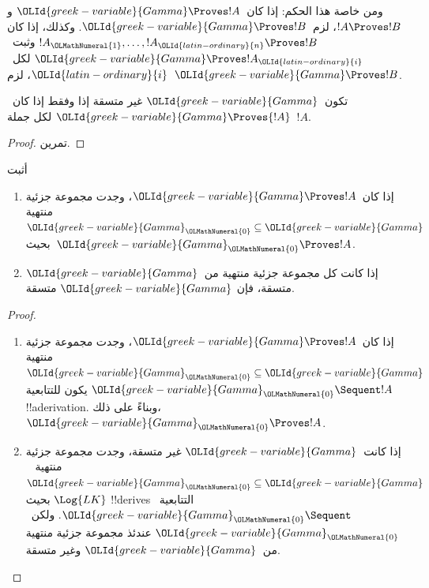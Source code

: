 \documentclass[../../../include/open-logic-section]{subfiles}
\begin{document}
ومن خاصة هذا الحكم: إذا كان~${\OLId{greek-variable}{Gamma}} \Proves !A$ و
$!A \Proves !B$، لزم~${\OLId{greek-variable}{Gamma}} \Proves !B$.
وكذلك، إذا كان $!A_{\OLMathNumeral{1}}, \dots, !A_{\OLId{latin-ordinary}{n}} \Proves !B$ وثبت~${\OLId{greek-variable}{Gamma}} \Proves !A_{\OLId{latin-ordinary}{i}}$ لكل~${\OLId{latin-ordinary}{i}}$،
لزم~${\OLId{greek-variable}{Gamma}} \Proves !B$.

\begin{prop}
تكون~${\OLId{greek-variable}{Gamma}}$ غير متسقة إذا وفقط إذا كان~${\OLId{greek-variable}{Gamma}} \Proves {!A}$ لكل
  جملة~$!A$.
\end{prop}

\begin{proof}
تمرين.
\end{proof}

\begin{prob}
أثبت 
\end{prob}

\begin{prop}[التراص]
  \begin{enumerate}
  \item إذا كان~${\OLId{greek-variable}{Gamma}} \Proves !A$، وجدت مجموعة جزئية منتهية
    ${\OLId{greek-variable}{Gamma}}_{\OLMathNumeral{0}} \subseteq {\OLId{greek-variable}{Gamma}}$ بحيث~${\OLId{greek-variable}{Gamma}}_{\OLMathNumeral{0}} \Proves !A$.
  \item إذا كانت كل مجموعة جزئية منتهية من~${\OLId{greek-variable}{Gamma}}$ متسقة، فإن
    ${\OLId{greek-variable}{Gamma}}$ متسقة.
  \end{enumerate}
\end{prop}

\begin{proof}
  \begin{enumerate}
    \item إذا كان~${\OLId{greek-variable}{Gamma}} \Proves !A$، وجدت مجموعة جزئية منتهية
      ${\OLId{greek-variable}{Gamma}}_{\OLMathNumeral{0}} \subseteq {\OLId{greek-variable}{Gamma}}$ يكون للتتابعية
      ${\OLId{greek-variable}{Gamma}}_{\OLMathNumeral{0}} \Sequent !A$ !!a{derivation}. وبناءً على ذلك،
      ${\OLId{greek-variable}{Gamma}}_{\OLMathNumeral{0}} \Proves !A$.
    \item إذا كانت~${\OLId{greek-variable}{Gamma}}$ غير متسقة، وجدت مجموعة جزئية منتهية
      ~${\OLId{greek-variable}{Gamma}}_{\OLMathNumeral{0}} \subseteq {\OLId{greek-variable}{Gamma}}$ بحيث $\Log{LK}$ !!{derive}s
      التتابعية~${\OLId{greek-variable}{Gamma}}_{\OLMathNumeral{0}} \Sequent \quad$. ولكن~${\OLId{greek-variable}{Gamma}}_{\OLMathNumeral{0}}$ عندئذ
      مجموعة جزئية منتهية من~${\OLId{greek-variable}{Gamma}}$ وغير متسقة.
  \end{enumerate}
\end{proof}
\end{document}
